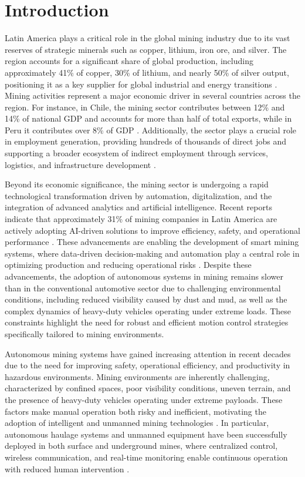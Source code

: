 \documentclass[letterpaper]{ifacconf}
\begin{document}
\section{Introduction}

Latin America plays a critical role in the global mining industry due to its vast reserves of strategic minerals such as copper, lithium, iron ore, and silver. The region accounts for a significant share of global production, including approximately 41\% of copper, 30\% of lithium, and nearly 50\% of silver output, positioning it as a key supplier for global industrial and energy transitions \citep{ref1}. Mining activities represent a major economic driver in several countries across the region. For instance, in Chile, the mining sector contributes between 12\% and 14\% of national GDP and accounts for more than half of total exports, while in Peru it contributes over 8\% of GDP \citep{ref2,ref3}. Additionally, the sector plays a crucial role in employment generation, providing hundreds of thousands of direct jobs and supporting a broader ecosystem of indirect employment through services, logistics, and infrastructure development \citep{ref4}.

Beyond its economic significance, the mining sector is undergoing a rapid technological transformation driven by automation, digitalization, and the integration of advanced analytics and artificial intelligence. Recent reports indicate that approximately 31\% of mining companies in Latin America are actively adopting AI-driven solutions to improve efficiency, safety, and operational performance \citep{ref5}. These advancements are enabling the development of smart mining systems, where data-driven decision-making and automation play a central role in optimizing production and reducing operational risks \citep{ref6}. Despite these advancements, the adoption of autonomous systems in mining remains slower than in the conventional automotive sector due to challenging environmental conditions, including reduced visibility caused by dust and mud, as well as the complex dynamics of heavy-duty vehicles operating under extreme loads. These constraints highlight the need for robust and efficient motion control strategies specifically tailored to mining environments.

Autonomous mining systems have gained increasing attention in recent decades due to the need for improving safety, operational efficiency, and productivity in hazardous environments. Mining environments are inherently challenging, characterized by confined spaces, poor visibility conditions, uneven terrain, and the presence of heavy-duty vehicles operating under extreme payloads. These factors make manual operation both risky and inefficient, motivating the adoption of intelligent and unmanned mining technologies \cite{ref1}. In particular, autonomous haulage systems and unmanned equipment have been successfully deployed in both surface and underground mines, where centralized control, wireless communication, and real-time monitoring enable continuous operation with reduced human intervention \cite{refIntelligentMining}.
\end{document}

